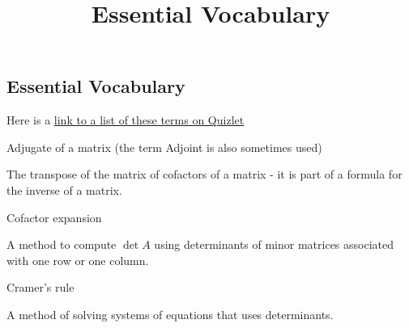 \documentclass{ximera}
\title{Essential Vocabulary} \license{CC BY-NC-SA 4.0}
\begin{document}
\begin{abstract}
\end{abstract}
\maketitle


\begin{onlineOnly}
\section*{Essential Vocabulary}
Here is a  \href{https://quizlet.com/906039813/chapter-7-vocabulary-flash-cards/?i=y06sd&x=1jqt}{link to a list of these terms on Quizlet}
\end{onlineOnly}


Adjugate of a matrix (the term Adjoint is also sometimes used)
\begin{expandable}{}{}
    The transpose of the matrix of cofactors of a matrix - it is part of a formula for the inverse of a matrix.
\end{expandable}


Cofactor expansion
\begin{expandable}{}{}
    A method to compute $\det A$ using determinants of minor matrices associated with one row or one column.
\end{expandable}


Cramer's rule
\begin{expandable}{}{}
    A method of solving systems of equations that uses determinants.
\end{expandable}

\end{document}
